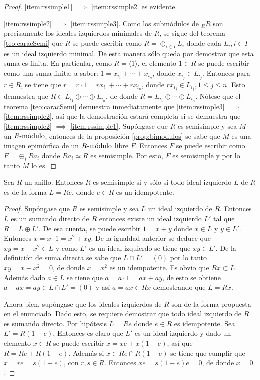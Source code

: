 \begin{proof}
\ref{item:rssimple1} $\implies$ \ref{item:rssimple2} es evidente.

\ref{item:rssimple2} $\implies$ \ref{item:rssimple3}. Como los submódulos de $_RR$ son precisamente los ideales izquierdos minimales de $R$, se sigue del teorema \ref{teo:caracSemi} que $R$ se puede escribir como $R = \oplus_{i \in I}L_i$ donde cada $L_i, i \in I$ es un ideal izquierdo minimal. De esta manera sólo queda por demostrar que esta suma es finita.
En particular, como $R = \langle 1 \rangle$, el elemento $1 \in R$ se puede escribir como una suma finita; a saber: $1 = x_{i_1} + \cdots + x_{i_n}$, donde $x_{i_j} \in L_{i_j}$. Entonces para $r \in R$, se tiene que $r = r \cdot 1 = rx_{i_1} + \cdots +rx_{i_n}$, donde $rx_{i_j} \in L_{i_j}, 1\leq j \leq n$. Esto demuestra que $R \subset L_{i_1} \oplus \cdots \oplus L_{i_n}$, de donde $R = L_{i_1} \oplus \cdots \oplus L_{i_n}$.
Nótese que el teorema \ref{teo:caracSemi} demuestra inmediatamente que \ref{item:rssimple3} $\implies$ \ref{item:rssimple2}, así que la demostración estará completa si se demuestra que \ref{item:rssimple2} $\implies$ \ref{item:rssimple1}. 
Supóngase que $R$ es semisimple y sea $M$ un $\modulo{R}$, entonces de la proposición \ref{prop:bimodulos} se sabe que $M$ es una imagen epimórfica de un $\modulo{R}$ libre $F$. Entonces $F$ se puede escribir como $F = \oplus_{i}Ra_i$ donde $Ra_i \simeq R$ es semisimple. Por esto, $F$ es semisimple y por lo tanto $M$ lo es. 
\end{proof}
\begin{teorema}\label{teo:idealIdem}
Sea $R$ un anillo. Entonces $R$ es semisimple si y sólo si todo ideal izquierdo $L$ de $R$ es de la forma $L = Re$, donde $e \in R$ es un idempotente.
\end{teorema}
\begin{proof}
Supóngase que $R$ es semisimple y sea $L$ un ideal  izquierdo de $R$. Entonces $L$ es un sumando directo de $R$ entonces existe un ideal izquierdo $L'$ tal que $R = L \oplus L'$. De esa cuenta, se puede escribir $1 = x + y$ donde $x \in L$ y $y \in L'$. Entonces $x = x \cdot 1 = x^2 + xy$. De la igualdad anterior se deduce que $xy = x - x^2 \in L$ y como $L'$ es un ideal izquierdo se tiene que $xy \in L'$. De la definición de suma directa se sabe que $L \cap L' = (0)$ por lo tanto $xy = x - x^2 = 0$, de donde $x = x^2$ es un idempotente. Es obvio que $Rx \subset L$. Además dado $a  \in L$ se tiene que $a = a \cdot 1 = ax + ay$, de esto se obtiene $a -ax = ay\in L\cap L'=(0)$ y así $a = ax \in Rx$ demostrando que $L = Rx$. 

Ahora bien, supóngase que los ideales izquierdos de $R$ son de la forma propuesta en el enunciado. Dado esto, se requiere demostrar que todo ideal izquierdo de $R$ es sumando directo. Por hipótesis $L = Re$ donde $e \in R$ es idempotente. Sea $L'= R(1-e)$. Entonces es claro que $L'$ es un ideal izquierdo y dado un elemento $x \in R$ se puede escribir $x = xe + x(1-e)$, así que $R = Re + R(1-e)$. Además si $x \in Re \cap R(1-e)$ se tiene que cumplir que $x = re = s(1-e)$, con $r,s \in R$. Entonces $xe = s(1-e)e = 0$, de donde $x = 0$.  
\end{proof}
